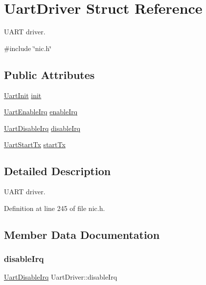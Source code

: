 \hypertarget{structUartDriver}{}\section{Uart\+Driver Struct Reference}
\label{structUartDriver}


U\+A\+RT driver.  




{\ttfamily \#include \char`\"{}nic.\+h\char`\"{}}

\subsection*{Public Attributes}
\begin{DoxyCompactItemize}
\item 
\hyperlink{nic_8h_ad480784aefd824e7a159728df3c51643}{Uart\+Init} \hyperlink{structUartDriver_a21eb90a91560951c4fe7ee7ba5456850}{init}
\item 
\hyperlink{nic_8h_ad360b535e20add52396382193c5c9cd9}{Uart\+Enable\+Irq} \hyperlink{structUartDriver_a8145020e65ebaa8ed409511078b5aa48}{enable\+Irq}
\item 
\hyperlink{nic_8h_abf355b7478afb1e1df154e42f41dbb58}{Uart\+Disable\+Irq} \hyperlink{structUartDriver_a026d05f7f431b65f442b31f66a4f5e8f}{disable\+Irq}
\item 
\hyperlink{nic_8h_a06153573bb814bc87bf01b68a91a4de5}{Uart\+Start\+Tx} \hyperlink{structUartDriver_a223db3e6a7b736919818c7669c24dd53}{start\+Tx}
\end{DoxyCompactItemize}


\subsection{Detailed Description}
U\+A\+RT driver. 

Definition at line 245 of file nic.\+h.



\subsection{Member Data Documentation}
\mbox{\label{structUartDriver_a026d05f7f431b65f442b31f66a4f5e8f}} 
\subsubsection{\texorpdfstring{disable\+Irq}{disableIrq}}
{\footnotesize\ttfamily \hyperlink{nic_8h_abf355b7478afb1e1df154e42f41dbb58}{Uart\+Disable\+Irq} Uart\+Driver\+::disable\+Irq}




